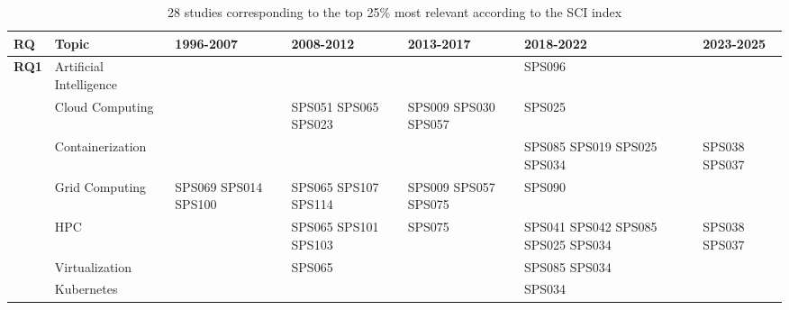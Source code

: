 \begin{table*}[htbp]
	\centering
	\caption{28 studies corresponding to the top 25\% most relevant according to the SCI index}
	\label{table:highest_SCI}
	\renewcommand{\arraystretch}{1.2}
	\setlength{\tabcolsep}{6pt}
	\begin{tabularx}{\textwidth}{p{0.8cm}p{2.5cm}>{\raggedright\arraybackslash}X>{\raggedright\arraybackslash}X>{\raggedright\arraybackslash}X>{\raggedright\arraybackslash}X>{\raggedright\arraybackslash}X}
		\toprule
		\textbf{RQ}                          & \textbf{Topic}         & \textbf{1996-2007}   & \textbf{2008-2012}   & \textbf{2013-2017}   & \textbf{2018-2022}                 & \textbf{2023-2025} \\
		\midrule
		\multirow{12}{*}[0em]{\textbf{RQ1}}  & Artificial Intelligence &                      &                      &                      & SPS096                             &                    \\
		\addlinespace[0.3em]
		                                     & Cloud Computing         &                      & SPS051 SPS065 SPS023 & SPS009 SPS030 SPS057 & SPS025                             &                    \\
		\addlinespace[0.3em]
		                                     & Containerization        &                      &                      &                      & SPS085 SPS019 SPS025 SPS034        & SPS038 SPS037      \\
		\addlinespace[0.3em]
		                                     & Grid Computing          & SPS069 SPS014 SPS100 & SPS065 SPS107 SPS114 & SPS009 SPS057 SPS075 & SPS090                             &                    \\
		\addlinespace[0.3em]
		                                     & HPC                     &                      & SPS065 SPS101 SPS103 & SPS075               & SPS041 SPS042 SPS085 SPS025 SPS034 & SPS038 SPS037      \\
		\addlinespace[0.3em]
		                                     & Virtualization          &                      & SPS065               &                      & SPS085 SPS034                      &                    \\
		\addlinespace[0.3em]
		                                     & Kubernetes              &                      &                      &                      & SPS034                             &                    \\

\end{tabularx}
\end{table*}
